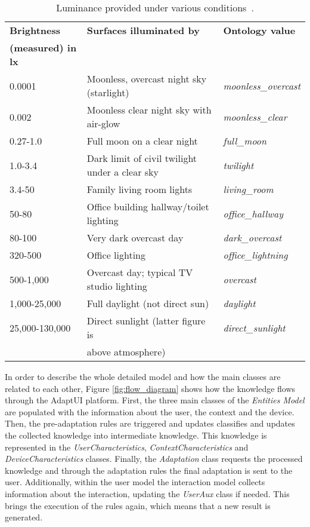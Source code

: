 \begin{table}[H]
  \caption{Luminance provided under various conditions~\citep{luminance}.}
 \label{tbl:luminance}
\footnotesize
\centering
 \begin{tabular}{l l l}
  \hline 
  \textbf{Brightness} & \textbf{Surfaces illuminated by}		& \textbf{Ontology value}	\\
  \textbf{(measured) in \ac{lx}}&					&				\\
  \hline
  0.0001		& Moonless, overcast night sky (starlight)	& \textit{moonless\_overcast}	\\
  0.002 		& Moonless clear night sky with air-glow	& \textit{moonless\_clear}	\\
  0.27-1.0		& Full moon on a clear night			& \textit{full\_moon}		\\
  1.0-3.4		& Dark limit of civil twilight under a clear sky& \textit{twilight}		\\
  3.4-50		& Family living room lights			& \textit{living\_room}		\\
  50-80 		& Office building hallway/toilet lighting	& \textit{office\_hallway}	\\
  80-100		& Very dark overcast day			& \textit{dark\_overcast}	\\
  320-500		& Office lighting				& \textit{office\_lightning}	\\
  500-1,000		& Overcast day; typical TV studio lighting	& \textit{overcast}		\\
  1,000-25,000		& Full daylight (not direct sun)		& \textit{daylight}		\\
  25,000-130,000	& Direct sunlight (latter figure is 		& \textit{direct\_sunlight}	\\
			& above atmosphere)				& 				\\
  \hline

\end{tabular}
\end{table}


In order to describe the whole detailed model and how the main classes are related
to each other, Figure \ref{fig:flow_diagram} shows how the knowledge flows through
the AdaptUI platform. First, the three main classes of the \textit{Entities Model}
are populated with the information about the user, the context and the device.
Then, the pre-adaptation rules are triggered and updates classifies and updates
the collected knowledge into intermediate knowledge. This knowledge is represented
in the \textit{UserCharacteristics}, \textit{ContextCharacteristics} and
\textit{DeviceCharacteristics} classes. Finally, the \textit{Adaptation} class
requests the processed knowledge and through the adaptation rules the final
adaptation is sent to the user. Additionally, within the user model the interaction
model collects information about the interaction, updating the \textit{UserAux}
class if needed. This brings the execution of the rules again, which means that
a new result is generated.


